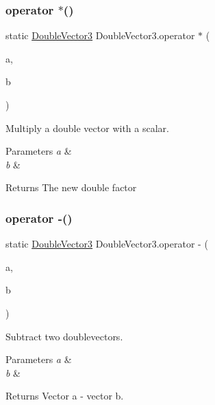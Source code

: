 \subsubsection{\texorpdfstring{operator $\ast$()}{operator *()}\hspace{0.1cm}{\footnotesize\ttfamily [2/2]}}
{\footnotesize\ttfamily static \mbox{\hyperlink{class_double_vector3}{Double\+Vector3}} Double\+Vector3.\+operator $\ast$ (\begin{DoxyParamCaption}\item[{double}]{a,  }\item[{\mbox{\hyperlink{class_double_vector3}{Double\+Vector3}}}]{b }\end{DoxyParamCaption})\hspace{0.3cm}{\ttfamily [static]}}



Multiply a double vector with a scalar. 


\begin{DoxyParams}{Parameters}
{\em a} & \\
\hline
{\em b} & \\
\hline
\end{DoxyParams}
\begin{DoxyReturn}{Returns}
The new double factor
\end{DoxyReturn}
\mbox{\label{class_double_vector3_aca5834e95f528046ba250127d6ffcf56}} 
\subsubsection{\texorpdfstring{operator -\/()}{operator -()}}
{\footnotesize\ttfamily static \mbox{\hyperlink{class_double_vector3}{Double\+Vector3}} Double\+Vector3.\+operator -\/ (\begin{DoxyParamCaption}\item[{\mbox{\hyperlink{class_double_vector3}{Double\+Vector3}}}]{a,  }\item[{\mbox{\hyperlink{class_double_vector3}{Double\+Vector3}}}]{b }\end{DoxyParamCaption})\hspace{0.3cm}{\ttfamily [static]}}



Subtract two doublevectors. 


\begin{DoxyParams}{Parameters}
{\em a} & \\
\hline
{\em b} & \\
\hline
\end{DoxyParams}
\begin{DoxyReturn}{Returns}
Vector a -\/ vector b.
\end{DoxyReturn}
\mbox{\label{class_double_vector3_a6d17dc0df1592c4358d677a68b133832}} 
